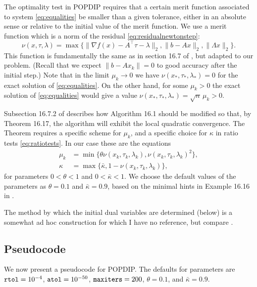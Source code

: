 \documentclass[11pt]{article}
\newcommand{\grad}{\nabla}
\begin{document}
The optimality test in POPDIP requires that a certain merit function associated to system \eqref{eq:equalities} be smaller than a given tolerance, either in an absolute sense or relative to the initial value of the merit function.  We use a merit function which is a norm of the residual \eqref{eq:residualnewtonstep}:
\begin{equation}
    \nu(x,\tau,\lambda) = \max\{\|\grad f(x)-A^\top \tau - \lambda\|_2,\|b-Ax\|_2,\|\Lambda x\|_2\}.  \label{eq:meritfunction}
\end{equation}
This function is fundamentally the same as in section 16.7 of \cite{GrivaNashSofer2009}, but adapted to our problem.  (Recall that we expect $\|b-Ax_k\|=0$ to good accuracy after the initial step.)  Note that in the limit $\mu_k\to 0$ we have $\nu(x_*,\tau_*,\lambda_*) = 0$ for the exact solution of \eqref{eq:equalities}.  On the other hand, for some $\mu_k > 0$ the exact solution of \eqref{eq:equalities} would give a value $\nu(x_*,\tau_*,\lambda_*)=\sqrt{n}\, \mu_k>0$.

Subsection 16.7.2 of \cite{GrivaNashSofer2009} describes how Algorithm 16.1 should be modified so that, by Theorem 16.17, the algorithm will exhibit the local quadratic convergence.  The Theorem requires a specific scheme for $\mu_k$, and a specific choice for $\kappa$ in ratio tests \eqref{eq:ratiotests}.  In our case these are the equations
\begin{align}
\mu_k &= \min\{\theta \nu(x_k,\tau_k,\lambda_k),\nu(x_k,\tau_k,\lambda_k)^2\}, \label{eq:muupdate} \\
\kappa &= \max\{\bar\kappa,1-\nu(x_k,\tau_k,\lambda_k)\}, \label{eq:kappaformula}
\end{align}
for parameters $0<\theta<1$ and $0<\bar\kappa<1$.  We choose the default values of the parameters as $\theta=0.1$ and $\bar\kappa=0.9$, based on the minimal hints in Example 16.16 in \cite{GrivaNashSofer2009}.

The method by which the initial dual variables are determined (below) is a somewhat ad hoc construction for which I have no reference, but compare \cite{Gertzetal2004}.


\subsection*{Pseudocode}

We now present a pseudocode for POPDIP.  The defaults for parameters are $\text{\texttt{rtol}}=10^{-4}$, $\text{\texttt{atol}}=10^{-50}$, $\text{\texttt{maxiters}}=200$, $\theta=0.1$, and $\bar\kappa=0.9$.
\end{document}
